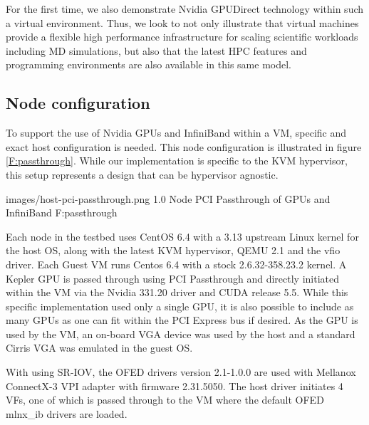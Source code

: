 \documentclass{sigplanconf}
\begin{document}
For the first time, we also demonstrate Nvidia GPUDirect technology within such a virtual environment.  Thus, we look to not only illustrate that virtual machines provide a flexible high performance infrastructure for scaling scientific workloads including MD simulations, but also that the latest HPC features and programming environments are also available in this same model.   

\subsection{Node configuration}

To support the use of Nvidia GPUs and InfiniBand within a VM, specific and exact host configuration is needed. This node configuration is illustrated in figure \ref{F:passthrough}.  While our implementation is specific to the KVM hypervisor, this setup represents a design that can be hypervisor agnostic.

  {images/host-pci-passthrough.png}
  {1.0}
  {Node PCI Passthrough of GPUs and InfiniBand}
  {F:passthrough}


Each node in the testbed uses CentOS 6.4 with a 3.13 upstream Linux kernel for the host OS, along with the latest KVM hypervisor, QEMU 2.1 and the vfio driver.  Each Guest VM runs Centos 6.4 with a stock 2.6.32-358.23.2 kernel. A Kepler GPU is passed through using PCI Passthrough and directly initiated within the VM via the Nvidia 331.20 driver and CUDA release 5.5. While this specific implementation used only a single GPU, it is also possible to include as many GPUs as one can fit within the PCI Express bus if desired. As the GPU is used by the VM, an on-board VGA device was used by the host and a standard Cirris VGA was emulated in the guest OS. 

With using SR-IOV, the OFED drivers version 2.1-1.0.0 are used with Mellanox ConnectX-3 VPI adapter with firmware 2.31.5050.  The host driver initiates 4 VFs, one of which is passed through to the VM where the default OFED mlnx\_ib drivers are loaded.  



\end{document}
